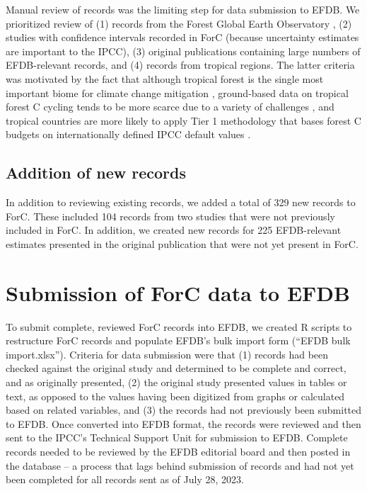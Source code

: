 \documentclass[, manuscript]{copernicus}
\begin{document}
Manual review of records was the limiting step for data submission to
EFDB. We prioritized review of (1) records from the Forest Global Earth
Observatory
\citep[ForestGEO,][]{anderson-teixeira_ctfsforestgeo_2015, davies_forestgeo_2021},
(2) studies with confidence intervals recorded in ForC (because
uncertainty estimates are important to the IPCC), (3) original
publications containing large numbers of EFDB-relevant records, and (4)
records from tropical regions. The latter criteria was motivated by the
fact that although tropical forest is the single most important biome
for climate change mitigation
\citep{griscom_natural_2017, griscom_national_2020}, ground-based data
on tropical forest C cycling tends to be more scarce due to a variety of
challenges \citep{anderson-teixeira_carbon_2021, delima_making_2022},
and tropical countries are more likely to apply Tier 1 methodology that
bases forest C budgets on internationally defined IPCC default values
\citep{romijn_assessing_2015}.

\subsection{Addition of new records}

In addition to reviewing existing records, we added a total of 329 new
records to ForC. These included 104 records from two studies
\citep{piponiot_distribution_2022, lutz_largediameter_2021} that were
not previously included in ForC. In addition, we created new records for
225 EFDB-relevant estimates presented in the original publication that
were not yet present in ForC.

\section{Submission of ForC data to EFDB}

To submit complete, reviewed ForC records into EFDB, we created R
scripts to restructure ForC records and populate EFDB's bulk import form
(``EFDB bulk import.xlsx''). Criteria for data submission were that (1)
records had been checked against the original study and determined to be
complete and correct, and as originally presented, (2) the original
study presented values in tables or text, as opposed to the values
having been digitized from graphs or calculated based on related
variables, and (3) the records had not previously been submitted to
EFDB. Once converted into EFDB format, the records were reviewed and
then sent to the IPCC's Technical Support Unit for submission to EFDB.
Complete records needed to be reviewed by the EFDB editorial board and
then posted in the database -- a process that lags behind submission of
records and had not yet been completed for all records sent as of July
28, 2023.
\end{document}
